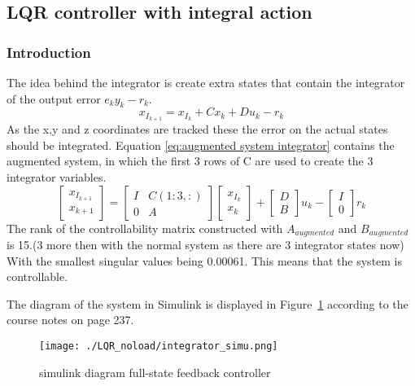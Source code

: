 \subsection{LQR controller with integral action}
\subsubsection{Introduction}
The idea behind the integrator is create extra states that contain the integrator of the output error $e_k y_k -r_k$.
$$
x_{I_{k+1}} = x_{I_{k}} + Cx_k + Du_k - r_k
$$
As the x,y and z coordinates are tracked these the error on the actual states should be integrated. Equation \ref{eq:augmented system integrator} contains the augmented system, in which the first 3 rows of C are used to create the 3 integrator variables. 
\begin{equation}
\begin{bmatrix}
x_{I_{k+1}} \\
x_{k+1}
\end{bmatrix}
=
\begin{bmatrix}
I&C(1:3,:) \\
0&A
\end{bmatrix}
\begin{bmatrix}
x_{I_{k}} \\
x_{k}
\end{bmatrix}
+
\begin{bmatrix}
D \\
B
\end{bmatrix}
u_k
-
\begin{bmatrix}
	I \\
	0
\end{bmatrix}
r_k
\label{eq:augmented system integrator}
\end{equation}
The rank of the controllability matrix constructed with $A_{augmented}$ and $B_{augmented}$ is 15.(3 more then with the normal system as there are 3 integrator states now) With the smallest singular values being 0.00061. This means that the system is controllable. 

The diagram of the system in Simulink is displayed in Figure~\ref{fig:simulink diagram full-state feedback controller with integrator} according to the course notes on page 237.

\begin{figure}[H]
	\centering
	\texttt{[image: ./LQR\_noload/integrator\_simu.png]}
	\caption{simulink diagram full-state feedback controller}
	\label{fig:simulink diagram full-state feedback controller with integrator}
\end{figure}

